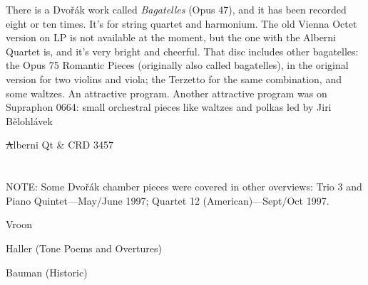 \documentclass[12pt]{article}%
\begin{document}
There is a  Dvořák work called \emph{Bagatelles} (Opus
47), and it has been recorded eight or ten times. It's for string quartet and harmonium.
The old Vienna Octet version on LP is not available at the moment, but the one with the Alberni Quartet is, and it's very bright and cheerful. That disc includes other bagatelles: the Opus 75 Romantic Pieces (originally also called bagatelles), in the original version for two violins and viola; the Terzetto for the same combination, and some waltzes. An attractive program. Another attractive program was on Supraphon 0664: small orchestral pieces like waltzes and polkas led by Jiri Bělohlávek 

\st
Alberni Qt & CRD 3457
\et

\section*{}

NOTE: Some  Dvořák chamber pieces were covered in other overviews: 
Trio 3 and Piano Quintet---May/June 1997; Quartet 12
(American)---Sept/Oct 1997.

\bigskip

\bigskip
\hfill{\sc Vroon}

\hfill{\sc Haller (Tone Poems and Overtures)}

\hfill{\sc Bauman (Historic)}
\end{document}
